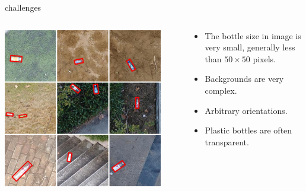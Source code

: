 \documentclass[newPxFont, fullfooter, sectionpages, progressbar]{beamer}
\begin{document}
\begin{frame}[c]{challenges}
	\only<3->
	{
		\begin{columns}
			\begin{column}{0.4\linewidth}
				\centering
				\includegraphics[width=0.9\textwidth]{images/bottle_UAV.png}
			\end{column}
	
			\begin{column}{0.6\linewidth}
				\begin{itemize}
					\item<3-> \footnotesize{The bottle size in image is very small, generally less than $50\times 50$ pixels.}
					\item<4-> \footnotesize{Backgrounds are very complex.}
					\item<5-> \footnotesize{Arbitrary orientations.}
					\item<6-> \footnotesize{Plastic bottles are often transparent.}
				\end{itemize}
			\end{column}
		\end{columns}
		\vspace{1cm}
	}
	
	


\end{frame}
\end{document}

